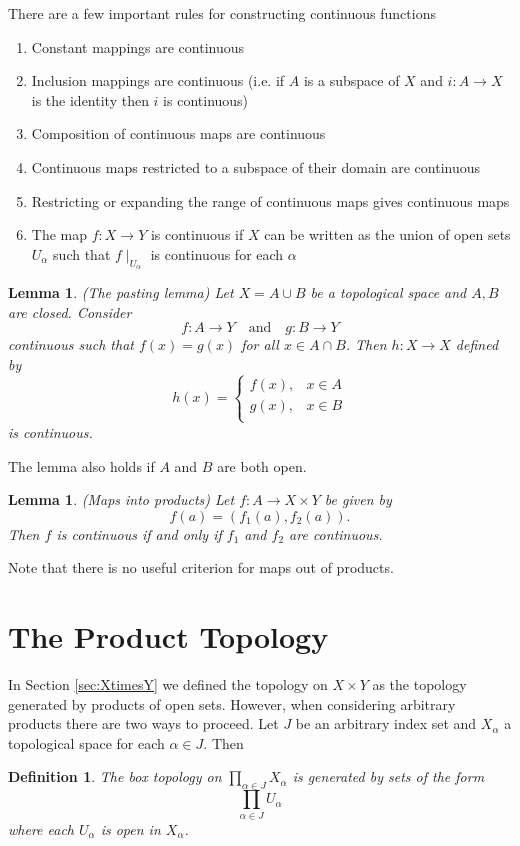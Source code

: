 \documentclass{article}
\newtheorem{lemma}[theorem]{Lemma}
\newtheorem*{definition}{Definition}
\theoremstyle{remark}
\begin{document}
There are a few important rules for constructing continuous functions
\begin{enumerate}
    \item Constant mappings are continuous
    \item Inclusion mappings are continuous (i.e. if $A$ is a subspace of $X$ and $i:A\to X$ is the identity then $i$ is continuous)
    \item Composition of continuous maps are continuous
    \item Continuous maps restricted to a subspace of their domain are continuous
    \item Restricting or expanding the range of continuous maps gives continuous maps
    \item The map $f:X\to Y$ is continuous if $X$ can be written as the union of open sets $U_\alpha$ such that $f\mid_{U_\alpha}$ is continuous for each $\alpha$
\end{enumerate}

\begin{lemma}{(The pasting lemma)}
    Let $X=A\cup B$ be a topological space and $A, B$ are closed. Consider
    $$ f:A\to Y\quad\text{and}\quad g:B\to Y$$
    continuous such that $f(x)=g(x)$ for all $x\in A\cap B$. Then $h:X\to X$ defined by
    $$ h(x)=\begin{cases}
        f(x),&x\in A\\
        g(x),&x\in B\\
    \end{cases}$$
    is continuous.
\end{lemma}
The lemma also holds if $A$ and $B$ are both open.
\begin{lemma}{(Maps into products)}
    Let $f:A\to X\times Y$ be given by
    $$f(a)=(f_1(a),f_2(a)).$$
    Then $f$ is continuous if and only if $f_1$ and $f_2$ are continuous.
\end{lemma}
Note that there is no useful criterion for maps out of products.

\section{The Product Topology}
In Section \ref{sec:XtimesY} we defined the topology on $X\times Y$ as the topology generated by products of open sets.
However, when considering arbitrary products there are two ways to proceed. Let $J$ be an arbitrary index set and $X_\alpha$ a topological space for each $\alpha\in J$. Then
\begin{definition}
    The box topology on $\prod_{\alpha\in J}X_\alpha$ is generated by sets of the form
    $$\prod_{\alpha\in J}U_\alpha$$
    where each $U_\alpha$ is open in $X_\alpha$.
\end{definition}
\end{document}
